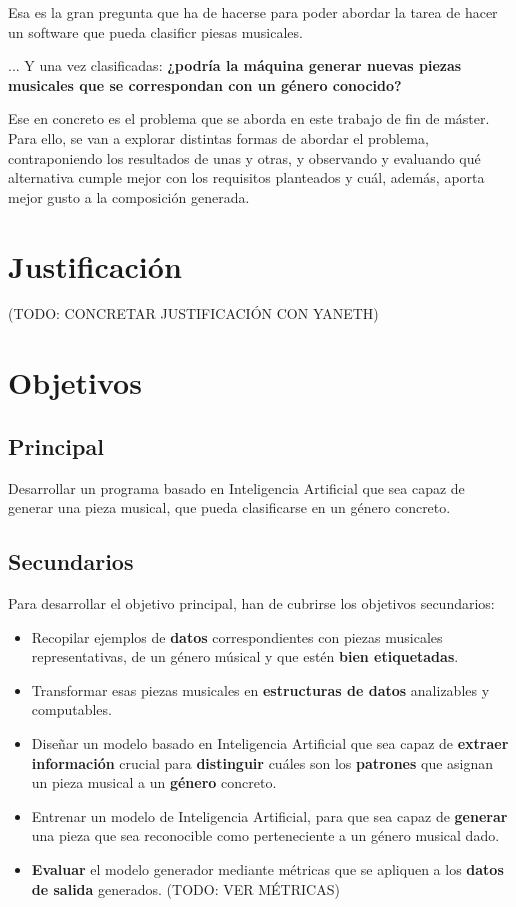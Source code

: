 Esa es la gran pregunta que ha de hacerse para poder abordar la tarea de hacer un software que pueda clasificr piesas musicales.

... Y una vez clasificadas: \textbf{¿podría la máquina generar nuevas piezas musicales que se correspondan con un género conocido?}

Ese en concreto es el problema que se aborda en este trabajo de fin de máster. Para ello, se van a explorar distintas formas de abordar el problema, contraponiendo los resultados de unas y otras, y observando y evaluando qué alternativa cumple mejor con los requisitos planteados y cuál, además, aporta mejor gusto a la composición generada.


\section{Justificación}
(TODO: CONCRETAR JUSTIFICACIÓN CON YANETH)

\section{Objetivos}
\subsection{Principal}
\label{objetivo-principal}
Desarrollar un programa basado en Inteligencia Artificial que sea capaz de generar una pieza musical, que pueda clasificarse en un género concreto.

\subsection{Secundarios}

Para desarrollar el objetivo principal, han de cubrirse los objetivos secundarios:

\begin{itemize}
    \item Recopilar ejemplos de \textbf{datos} correspondientes con piezas musicales representativas, de un género músical y que estén \textbf{bien etiquetadas}.
    
    \item Transformar esas piezas musicales en \textbf{estructuras de datos} analizables y computables.

    \item Diseñar un modelo basado en Inteligencia Artificial que sea capaz de \textbf{extraer información} crucial para \textbf{distinguir} cuáles son los \textbf{patrones} que asignan un pieza musical a un \textbf{género} concreto.

    \item Entrenar un modelo de Inteligencia Artificial, para que sea capaz de \textbf{generar} una pieza que sea reconocible como perteneciente a un género musical dado.

    \item \textbf{Evaluar} el modelo generador mediante métricas que se apliquen a los \textbf{datos de salida} generados. (TODO: VER MÉTRICAS)
\end{itemize}

